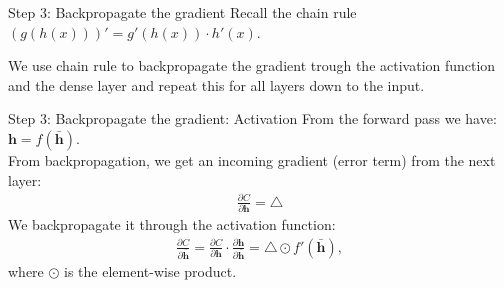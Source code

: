 \documentclass{beamer}
\begin{document}
		
		\begin{frame}{Step 3: Backpropagate the gradient}
		Recall the chain rule $(g(h(x)))' = g'(h(x)) \cdot h'(x)$.

		We use chain rule to backpropagate the gradient trough the activation function and the dense layer and repeat this for all layers down to the input.
	\end{frame}
	
	\begin{frame}{Step 3: Backpropagate the gradient: Activation}
		From the forward pass we have: $\mathbf{h} = f(\bar{\mathbf{h}})$. \\
		From backpropagation, we get an incoming gradient (error term) from the next layer:  
		\begin{align*}
        \frac{\partial C}{\partial \mathbf{h}} = \triangle
      \end{align*}
			We backpropagate it through the activation function:
			\begin{align*}
        \frac{\partial C}{\partial \bar{\mathbf{h}}} = \frac{\partial C}{\partial \mathbf{h}} \cdot \frac{\partial \mathbf{h}}{\partial \bar{\mathbf{h}}} = \triangle \odot f'(\bar{\mathbf{h}}),
      \end{align*}
			where $\odot$ is the element-wise product.
	\end{frame}
	
\end{document}
